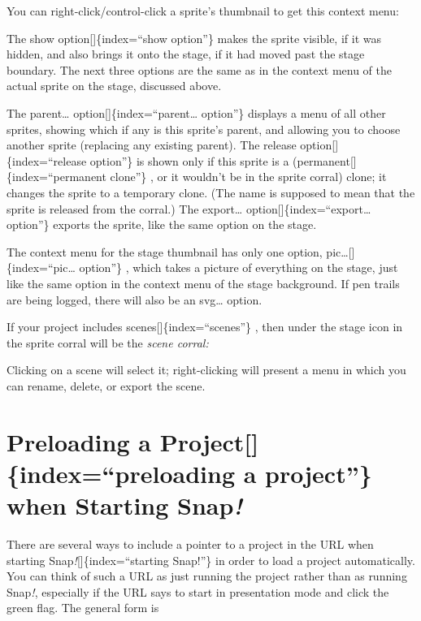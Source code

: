 \documentclass[
  letterpaper,
]{book}
\begin{document}
You can right-click/control-click a sprite's thumbnail to get this
context menu:

The show option{[}{]}\{index=``show option''\} makes the sprite visible,
if it was hidden, and also brings it onto the stage, if it had moved
past the stage boundary. The next three options are the same as in the
context menu of the actual sprite on the stage, discussed above.

The parent\ldots{} option{[}{]}\{index=``parent\ldots{} option''\}
displays a menu of all other sprites, showing which if any is this
sprite's parent, and allowing you to choose another sprite (replacing
any existing parent). The release option{[}{]}\{index=``release
option''\} is shown only if this sprite is a
(permanent{[}{]}\{index=``permanent clone''\} , or it wouldn't be in the
sprite corral) clone; it changes the sprite to a temporary clone. (The
name is supposed to mean that the sprite is released from the corral.)
The export\ldots{} option{[}{]}\{index=``export\ldots{} option''\}
exports the sprite, like the same option on the stage.

The context menu for the stage thumbnail has only one option,
pic\ldots{[}{]}\{index=``pic\ldots{} option''\} , which takes a picture
of everything on the stage, just like the same option in the context
menu of the stage background. If pen trails are being logged, there will
also be an svg\ldots{} option.

If your project includes scenes{[}{]}\{index=``scenes''\} , then under
the stage icon in the sprite corral will be the \emph{scene corral:}

Clicking on a scene will select it; right-clicking will present a menu
in which you can rename, delete, or export the scene.

\section{\texorpdfstring{Preloading a Project{[}{]}\{index=``preloading
a project''\} when Starting
Snap\emph{!}}{Preloading a Project{[}{]}\{index=``preloading a project''\} when Starting Snap!}}\label{preloading-a-projectindexpreloading-a-project-when-starting-snap}

There are several ways to include a pointer to a project in the URL when
starting Snap\emph{!}{[}{]}\{index=``starting Snap!''\} in order to load
a project automatically. You can think of such a URL as just running the
project rather than as running Snap\emph{!}, especially if the URL says
to start in presentation mode and click the green flag. The general form
is
\end{document}
